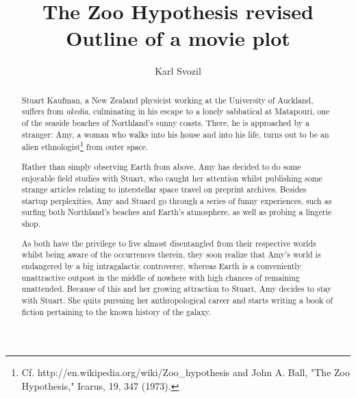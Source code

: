 \documentclass[pra,amsfonts,showpacs,showkeys,12pt]{revtex4-1}
\begin{document}



\title{The Zoo Hypothesis revised\\
       Outline of a movie plot}

\author{Karl Svozil}


\begin{abstract}
Stuart Kaufman, a New Zealand physicist working at the University of Auckland, suffers from {\em akedia},
culminating in his escape to a lonely sabbatical at Matapouri, one of the seaside beaches of Northland's sunny coasts.
There, he is approached by a stranger: Amy, a woman who walks into his house and into his life,
turns out to be an alien ethnologist\footnote{Cf.
http://en.wikipedia.org/wiki/Zoo\_hypothesis and
John A. Ball,  "The Zoo Hypothesis," Icarus, 19, 347 (1973).} from outer space.

Rather than simply observing Earth from above,
Amy has decided to do some enjoyable field studies with Stuart, who caught her attention whilst publishing
some strange articles relating to  interstellar space travel on preprint archives.
Besides startup perplexities, Amy and Stuard go through a series of funny experiences,
such as surfing both Northland's beaches and Earth's atmosphere, as well as probing a lingerie shop.

As both have the privilege to live almost disentangled from their respective worlds whilst
being aware of the occurrences therein, they soon realize that Amy's world is endangered by a big intragalactic controversy,
whereas Earth is a conveniently unattractive outpost in the middle of nowhere with high chances of remaining unattended.
Because of this and her growing attraction to Stuart, Amy decides to stay with Stuart.
She quits pursuing her anthropological career and starts writing a book of fiction pertaining to the known history of the galaxy.
\end{abstract}

\maketitle



%
%
\end{document}
